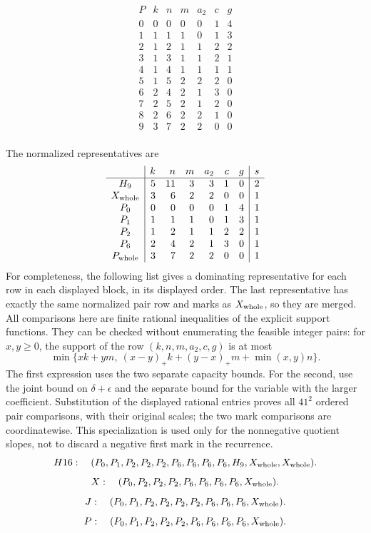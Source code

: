 \[
\begin{array}{c|rrrrrr}
P&k&n&m&a_2&c&g\\\hline
0&0&0&0&0&1&4\\
1&1&1&1&0&1&3\\
2&1&2&1&1&2&2\\
3&1&3&1&1&2&1\\
4&1&4&1&1&1&1\\
5&1&5&2&2&2&0\\
6&2&4&2&1&3&0\\
7&2&5&2&1&2&0\\
8&2&6&2&2&1&0\\
9&3&7&2&2&0&0\\
\end{array}
\]

The normalized representatives are
\[
\begin{array}{c|rrrrrr|c}
 &k&n&m&a_2&c&g&s\\\hline
 H_9&5&11&3&3&1&0&2\\
 X_{\rm whole}&3&6&2&2&0&0&1\\
 P_0&0&0&0&0&1&4&1\\
 P_1&1&1&1&0&1&3&1\\
 P_2&1&2&1&1&2&2&1\\
 P_6&2&4&2&1&3&0&1\\
 P_{\rm whole}&3&7&2&2&0&0&1
\end{array}
\]
For completeness, the following list gives a dominating representative
for each row in each displayed block, in its displayed order.
The last representative has exactly the same normalized pair row and
marks as $X_{\rm whole}$, so they are merged. All comparisons here are
finite rational inequalities of the explicit support functions.
They can be checked without enumerating the feasible integer pairs:
for $x,y\geq0$, the support of the row $(k,n,m,a_2,c,g)$ is at most
\[
 \min\bigl\{xk+ym,\ (x-y)_+k+(y-x)_+m+\min(x,y)n\bigr\}.
\]
The first expression uses the two separate capacity bounds. For the
second, use the joint bound on $\delta+\epsilon$ and the separate
bound for the variable with the larger coefficient. Substitution of
the displayed rational entries proves all $41^2$ ordered pair
comparisons, with their original scales; the two mark comparisons are
coordinatewise. This specialization is used only for the nonnegative
quotient slopes, not to discard a negative first mark in the recurrence.
\[
H16:\quad (P_0,P_1,P_2,P_2,P_2,P_6,P_6,P_6,P_6,H_9,X_{\rm whole},X_{\rm whole}).
\]
\[
X:\quad (P_0,P_2,P_2,P_2,P_6,P_6,P_6,P_6,X_{\rm whole}).
\]
\[
J:\quad (P_0,P_1,P_2,P_2,P_2,P_2,P_6,P_6,P_6,X_{\rm whole}).
\]
\[
P:\quad (P_0,P_1,P_2,P_2,P_2,P_6,P_6,P_6,P_6,X_{\rm whole}).
\]

